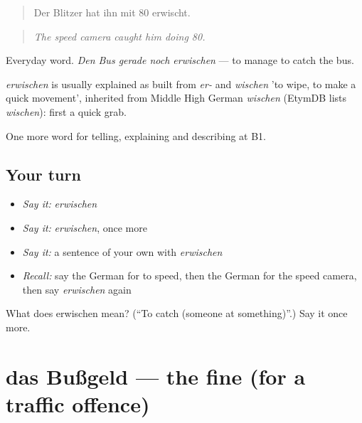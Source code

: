 \begin{quote}
Der Blitzer hat ihn mit 80 erwischt.
\end{quote}

\begin{quote}
\emph{The speed camera caught him doing 80.}
\end{quote}

Everyday word. \emph{Den Bus gerade noch erwischen} — to manage to catch the bus.

\begin{cousinweb}
\emph{erwischen} is usually explained as built from \emph{er-} and \emph{wischen} 'to wipe, to make a quick movement', inherited from Middle High German \emph{wischen} (EtymDB lists \emph{wischen}): first a quick grab.
\end{cousinweb}

\begin{grammarlens}[title={What you've built}]
One more word for telling, explaining and describing at B1.
\end{grammarlens}

\subsection*{Your turn}
\begin{itemize}
\raggedright
  \item \emph{Say it:} \emph{erwischen}
  \item \emph{Say it:} \emph{erwischen}, once more
  \item \emph{Say it:} a sentence of your own with \emph{erwischen}
  \item \emph{Recall:} say the German for to speed, then the German for the speed camera, then say \emph{erwischen} again
\end{itemize}

\begin{tcolorbox}[breakable,colback=teal!4,colframe=teal!35!black,title={Before you move on}]
What does erwischen mean? (\textquotedblleft{}To catch (someone at something)\textquotedblright{}.) Say it once more.
\end{tcolorbox}
\section[das Bußgeld]{das Bußgeld — the fine (for a traffic offence)}

\label{lesson:GE-C407-bussgeld}



